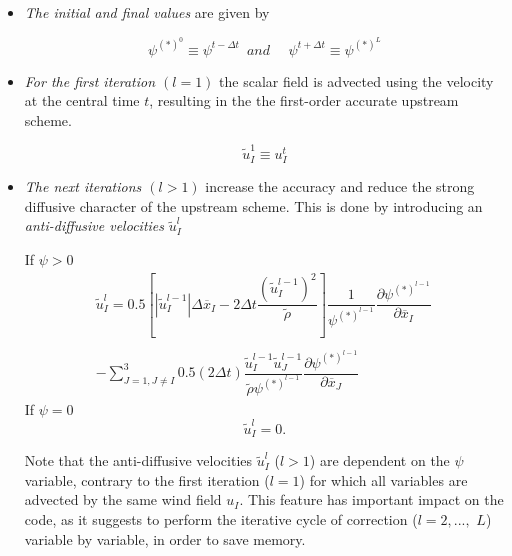 \begin{itemize}

\item {\em The initial and final values} are given by

\begin{equation}
\psi^{(*)^{0}}\equiv \psi^{t-\Delta t} \, \, \, and \, \, \, \, \, \, \, \,
\psi^{t+\Delta t}\equiv \psi^{(*)^{L}}
\end{equation}

\item {\em For the first iteration $(l=1)$} the scalar field is advected using
the velocity at the central time $t$, resulting in the the first-order accurate
upstream scheme.

\begin{equation}
\tilde{u}_I^{1}\equiv {u}_{I}^{t}
\end{equation}

\item {\em The next iterations $(l>1)$} increase the accuracy and
reduce the strong diffusive character of the upstream scheme. This
is done by introducing an
{\em anti-diffusive velocities} $\tilde{u}_I^{l}$

If $\psi > 0$
\begin{eqnarray}
\tilde{u}_{I}^{l}  =
0.5 \left[ |{\tilde{u}_I^{l-1}}| \Delta \overline{x}_I
       -{2 \Delta t}\dfrac{(\tilde{u}_I^{l-1})^{2}} {\tilde{\rho}}  \right]
\dfrac{1}{\psi^{(*)^{l-1}}}
\dfrac{\partial \psi^{(*)^{l-1}}}{\partial \overline{x}_I} \,
\nonumber \\
\nonumber \\
- \sum_{J=1,J\neq I}^{3}  0.5({2 \Delta t})
\dfrac{ \tilde{u}_I^{l-1}\tilde{u}_J^{l-1} } {\tilde{\rho} \psi^{(*)^{l-1}}}
\dfrac{\partial \psi^{(*)^{l-1}}}{\partial \overline{x}_J}
\end{eqnarray}
If $\psi = 0$
\begin{equation}
\tilde{u}_I^{l}  = 0.
\end{equation}

 Note that the anti-diffusive velocities
$\tilde{u}_I^{l}$ ($l>1$) are dependent on the $\psi$ variable, contrary to
the first iteration ($l=1$) for which all variables are advected by
the same wind field ${u}_{I}$. This feature has
important impact on the code, as it suggests to perform the iterative cycle
of correction ($l=2,...,$ $ L$) variable by variable, in order to save memory.

\end{itemize}

